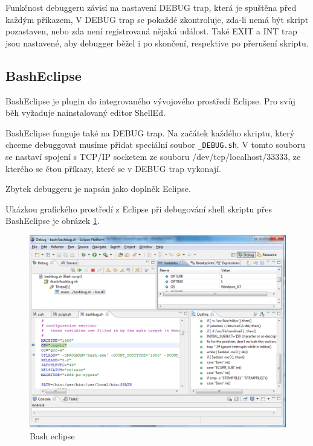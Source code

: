 \documentclass[thesis=M,czech]{FITthesis}[2012/06/26]
\begin{document}
Funkčnost debuggeru závisí na nastavení DEBUG trap, která je spuštěna před každým příkazem, V DEBUG trap se pokaždé zkontroluje, zda-li nemá být skript pozastaven, nebo zda není registrovaná nějaká událost. Také EXIT a INT trap jsou nastavené, aby debugger běžel i po skončení, respektive po přerušení skriptu.





\subsection{BashEclipse}

BashEclipse je plugin do integrovaného vývojového prostředí Eclipse. Pro svůj běh vyžaduje nainstalovaný editor ShellEd.

BashEclipse funguje také na DEBUG trap. Na začátek každého skriptu, který chceme debuggovat musíme přidat speciální soubor \texttt{\_DEBUG.sh}. V tomto souboru se nastaví spojení s TCP/IP socketem ze souboru /dev/tcp/localhost/33333, ze kterého se čtou příkazy, které se v DEBUG trap vykonají.

Zbytek debuggeru je napsán jako doplněk Eclipse.

Ukázkou grafického prostředí z Eclipse při debugování shell skriptu přes BashEclipse je obrázek \ref{fig:bash_eclipse}.

\begin{figure}
	\includegraphics[width=1.0\textwidth]{./images/bash_eclipse}
	\caption{Bash eclipse}
	\label{fig:bash_eclipse}
\end{figure}
\end{document}
